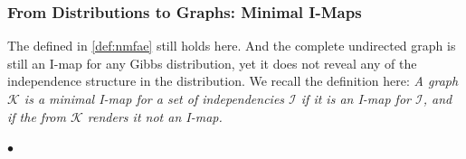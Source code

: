 \documentclass{article}
\begin{document}
\subsubsection{From Distributions to Graphs: Minimal I-Maps}\label{sec:dis2imapmark}
The  defined in \cref{def:nmfae} still holds here. And the complete undirected graph is still an I-map for any Gibbs distribution, yet it does not reveal any of the independence structure in the distribution. We recall the definition here: \emph{A graph $\mathcal{K}$ is a minimal I-map for a set of independencies $\mathcal{I}$ if it is an I-map for $\mathcal{I}$, and if the  from $\mathcal{K}$ renders it not an I-map.}

$\bullet$  
\end{document}
